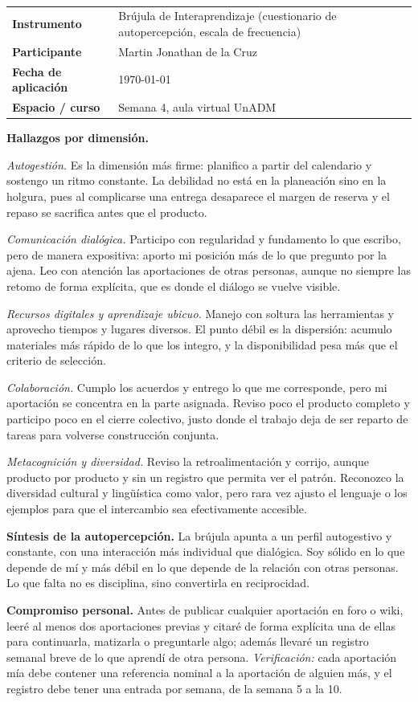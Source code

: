 \documentclass[
  spanish,
  letterpaper, oneside
]{article}
\makeatletter
\newcommand{\fichaCopyButton}[1]{%
  \textattachfile[appearance={},description={Ficha de recuperacion (texto copiable)},mimetype=text/plain]{#1}{%
    \colorbox{unadmGreen}{\small\textcolor{white}{\,Copiar ficha\,}}%
  }%
}
\newcommand{\fichameta}[4]{%
  \begin{tcolorbox}[colback=unadmRowAlt,colframe=unadmRowAlt,boxrule=0pt,arc=1mm,
    left=2mm,right=2mm,top=1.5mm,bottom=1.5mm]
  {\small\begin{tabular}{@{}p{3.4cm}p{9.6cm}@{}}
    \textbf{Instrumento} & #1 \\
    \textbf{Participante} & #2 \\
    \textbf{Fecha de aplicación} & #3 \\
    \textbf{Espacio / curso} & #4 \\
  \end{tabular}}
  \end{tcolorbox}\medskip}
\makeatother
\begin{document}
\begin{fichabox}[title={Ficha de recuperación de mi Brújula de Interaprendizaje}]
\hfill\fichaCopyButton{ficha-brujula-Actividad-4.txt}\\[-0.5em]
\label{ficha-brujula}
\fichameta{Brújula de Interaprendizaje (cuestionario de autopercepción, escala de frecuencia)}{Martin Jonathan de la Cruz}{\today}{Semana 4, aula virtual UnADM}

\textbf{Hallazgos por dimensión.}\par
\medskip
\textit{Autogestión.} Es la dimensión más firme: planifico a partir del calendario y
sostengo un ritmo constante. La debilidad no está en la planeación sino en la
holgura, pues al complicarse una entrega desaparece el margen de reserva y el repaso
se sacrifica antes que el producto.

\textit{Comunicación dialógica.} Participo con regularidad y fundamento lo que
escribo, pero de manera expositiva: aporto mi posición más de lo que pregunto por la
ajena. Leo con atención las aportaciones de otras personas, aunque no siempre las
retomo de forma explícita, que es donde el diálogo se vuelve visible.

\textit{Recursos digitales y aprendizaje ubicuo.} Manejo con soltura las herramientas
y aprovecho tiempos y lugares diversos. El punto débil es la dispersión: acumulo
materiales más rápido de lo que los integro, y la disponibilidad pesa más que el
criterio de selección.

\textit{Colaboración.} Cumplo los acuerdos y entrego lo que me corresponde, pero mi
aportación se concentra en la parte asignada. Reviso poco el producto completo y
participo poco en el cierre colectivo, justo donde el trabajo deja de ser reparto de
tareas para volverse construcción conjunta.

\textit{Metacognición y diversidad.} Reviso la retroalimentación y corrijo, aunque
producto por producto y sin un registro que permita ver el patrón. Reconozco la
diversidad cultural y lingüística como valor, pero rara vez ajusto el lenguaje o los
ejemplos para que el intercambio sea efectivamente accesible.

\medskip
\textbf{Síntesis de la autopercepción.} La brújula apunta a un perfil autogestivo y
constante, con una interacción más individual que dialógica. Soy sólido en lo que
depende de mí y más débil en lo que depende de la relación con otras personas. Lo que
falta no es disciplina, sino convertirla en reciprocidad.

\medskip
\textbf{Compromiso personal.} Antes de publicar cualquier aportación en foro o wiki,
leeré al menos dos aportaciones previas y citaré de forma explícita una de ellas para
continuarla, matizarla o preguntarle algo; además llevaré un registro semanal breve
de lo que aprendí de otra persona. \textit{Verificación:} cada aportación mía debe
contener una referencia nominal a la aportación de alguien más, y el registro debe
tener una entrada por semana, de la semana 5 a la 10.


\end{fichabox}
\end{document}
